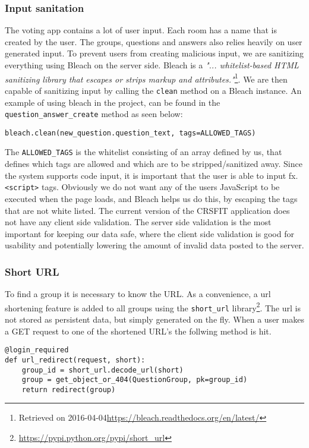 \subsubsection*{Input sanitation}
The voting app contains a lot of user input. Each room has a name that is created by the user. The groups, questions and answers also relies heavily on user generated input. To prevent users from creating malicious input, we are sanitizing everything using Bleach on the server side. Bleach is a \emph{"... whitelist-based HTML sanitizing library that escapes or strips markup and attributes."}\footnote{Retrieved on 2016-04-04\url{https://bleach.readthedocs.org/en/latest/}}. We are then capable of sanitizing input by calling the \texttt{clean} method on a Bleach instance. An example of using bleach in the project, can be found in the \texttt{question\_answer\_create} method as seen below:

\begin{lstlisting}[caption=Using Bleach to sanitize input, label=lst:bleach]
bleach.clean(new_question.question_text, tags=ALLOWED_TAGS)
\end{lstlisting}

The \texttt{ALLOWED\_TAGS} is the whitelist consisting of an array defined by us, that defines which tags are allowed and which are to be stripped/sanitized away. Since the system supports code input, it is important that the user is able to input fx. \texttt{<script>} tags. Obviously we do not want any of the users JavaScript to be executed when the page loads, and Bleach helps us do this, by escaping the tags that are not white listed.
The current version of the CRSFIT application does not have any client side validation. The server side validation is the most important for keeping our data safe, where the client side validation is good for usability and potentially lowering the amount of invalid data posted to the server. 

\subsubsection*{Short URL}
To find a group it is necessary to know the URL. As a convenience, a url shortening feature is added to all groups using the \texttt{short\_url} library\footnote{\url{https://pypi.python.org/pypi/short_url}}. The url is not stored as persistent data, but simply generated on the fly. When a user makes a GET request to one of the shortened URL's the follwing method is hit.

\begin{lstlisting}[caption=The URL redirect method, label=lst:url-redirect]
@login_required
def url_redirect(request, short):
    group_id = short_url.decode_url(short)
    group = get_object_or_404(QuestionGroup, pk=group_id)
    return redirect(group)
\end{lstlisting}

